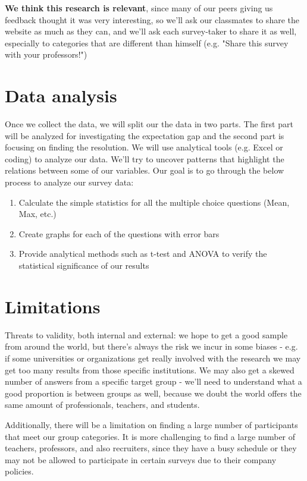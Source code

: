 \documentclass{sigchi}
\begin{document}
 \textbf{We think this research is relevant}, since many of our peers giving us feedback thought it was very interesting, so we'll ask our classmates to share the website as much as they can, and we'll ask each survey-taker to share it as well, especially to categories that are different than himself (e.g. "Share this survey with your professors!")
 
 \section{Data analysis}
 Once we collect the data, we will split our the data in two parts. The first part will be analyzed for investigating the expectation gap and the second part is focusing on finding the resolution. We will use analytical tools (e.g. Excel or coding) to analyze our data. We'll try to uncover patterns that highlight the relations between some of our variables. Our goal is to go through the below process to analyze our survey data:\\
\begin{enumerate}
	\item Calculate the simple statistics for all the multiple choice questions (Mean, Max, etc.)
	\item Create graphs for each of the questions with error bars
	\item Provide analytical methods such as t-test and ANOVA to verify the statistical significance of our results
\end{enumerate}

 
 \section{Limitations}
 Threats to validity, both internal and external: we hope to get a good sample from around the world, but there's always the risk we incur in some biases - e.g. if some universities or organizations get really involved with the research we may get too many results from those specific institutions. We may also get a skewed number of answers from a specific target group - we'll need to understand what a good proportion is between groups as well, because we doubt the world offers the same amount of professionals, teachers, and students.
 
Additionally, there will be a limitation on finding a large number of participants that meet our group categories. It is more challenging to find a large number of teachers, professors, and also recruiters, since they have a busy schedule or they may not be allowed to participate in certain surveys due to their company policies. 
  
\end{document}
